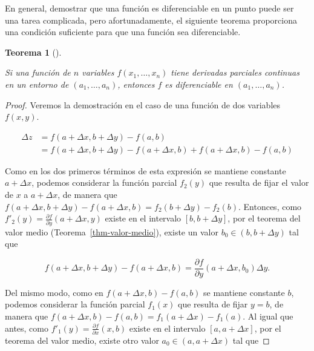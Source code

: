 \documentclass[
  a4paper,
]{scrreport}
\theoremstyle{definition}
\theoremstyle{plain}
\newtheorem{theorem}{Teorema}[chapter]
\theoremstyle{plain}
\theoremstyle{definition}
\theoremstyle{definition}
\theoremstyle{plain}
\theoremstyle{remark}
\begin{document}
En general, demostrar que una función es diferenciable en un punto puede
ser una tarea complicada, pero afortunadamente, el siguiente teorema
proporciona una condición suficiente para que una función sea
diferenciable.

\begin{theorem}[]\protect\hypertarget{thm-diferenciabilidad-funciones-varias-variables}{}\label{thm-diferenciabilidad-funciones-varias-variables}

Si una función de \(n\) variables \(f(x_1,\ldots,x_n)\) tiene derivadas
parciales continuas en un entorno de \((a_1,\ldots,a_n)\), entonces
\(f\) es diferenciable en \((a_1,\ldots,a_n)\).

\end{theorem}

\begin{tcolorbox}[enhanced jigsaw, breakable, title=\textcolor{quarto-callout-note-color}{\faInfo}\hspace{0.5em}{Demostración}, toprule=.15mm, coltitle=black, arc=.35mm, rightrule=.15mm, colframe=quarto-callout-note-color-frame, colbacktitle=quarto-callout-note-color!10!white, toptitle=1mm, titlerule=0mm, leftrule=.75mm, opacityback=0, colback=white, bottomrule=.15mm, bottomtitle=1mm, left=2mm, opacitybacktitle=0.6]

\begin{proof}

Veremos la demostración en el caso de una función de dos variables
\(f(x,y)\).

\begin{align*}
\Delta z 
&= f(a+\Delta x, b+\Delta y) - f(a,b) \\
&= f(a+\Delta x, b+\Delta y) - f(a+\Delta x, b) + f(a+\Delta x, b) - f(a,b) 
\end{align*}

Como en los dos primeros términos de esta expresión se mantiene
constante \(a+\Delta x\), podemos considerar la función parcial
\(f_2(y)\) que resulta de fijar el valor de \(x\) a \(a+\Delta x\), de
manera que
\(f(a+\Delta x, b+\Delta y) - f(a+\Delta x, b) = f_2(b+\Delta y)-f_2(b)\).
Entonces, como \(f'_2(y)=\frac{\partial f}{\partial y}(a+\Delta x, y)\)
existe en el intervalo \([b, b+\Delta y]\), por el teorema del valor
medio (Teorema~\ref{thm-valor-medio}), existe un valor
\(b_0\in(b, b+\Delta y)\) tal que

\[
f(a+\Delta x, b+\Delta y) - f(a+\Delta x, b) = \frac{\partial f}{\partial y}(a+\Delta x, b_0) \Delta y.
\]

Del mismo modo, como en \(f(a+\Delta x, b) - f(a,b)\) se mantiene
constante \(b\), podemos considerar la función parcial \(f_1(x)\) que
resulta de fijar \(y=b\), de manera que
\(f(a+\Delta x, b) - f(a,b)=f_1(a+\Delta x)-f_1(a)\). Al igual que
antes, como \(f'_1(y)=\frac{\partial f}{\partial x}(x, b)\) existe en el
intervalo \([a, a+\Delta x]\), por el teorema del valor medio, existe
otro valor \(a_0\in(a, a+\Delta x)\) tal que


\end{proof}
\end{tcolorbox}
\end{document}
